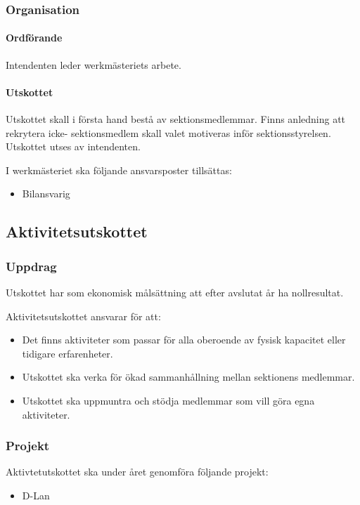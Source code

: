 \documentclass{datateknologsektionen-document}
\begin{document}
\subsubsection{Organisation}
\paragraph{Ordförande}
Intendenten leder werkmästeriets arbete.

\paragraph{Utskottet}

Utskottet skall i första hand bestå av sektionsmedlemmar. Finns anledning att rekrytera icke-
sektionsmedlem skall valet motiveras inför sektionsstyrelsen. Utskottet utses av intendenten.

I werkmästeriet ska följande ansvarsposter tillsättas:
\begin{itemize}
  \item Bilansvarig
\end{itemize}

\subsection{Aktivitetsutskottet}
\label{aktu}
\subsubsection{Uppdrag}
Utskottet har som ekonomisk målsättning att efter avslutat år ha nollresultat.

Aktivitetsutskottet ansvarar för att:
\begin{itemize}
  \item Det finns aktiviteter som passar för alla oberoende av fysisk kapacitet eller tidigare erfarenheter.
  \item Utskottet ska verka för ökad sammanhållning mellan sektionens medlemmar.
  \item Utskottet ska uppmuntra och stödja medlemmar som vill göra egna aktiviteter.
\end{itemize}
\subsubsection{Projekt}
Aktivtetutskottet ska under året genomföra följande projekt:
\begin{itemize}
  \item D-Lan
\end{itemize}
\end{document}
